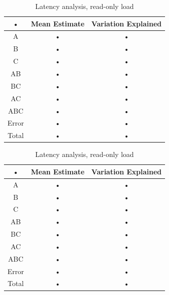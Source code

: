\documentclass[11pt,a4paper]{article}
\begin{document}
\begin{table}
\begin{minipage}{.5\textwidth}
\centering
	\begin{tabular}{|c|c|c|}
	\hline 
	• & {\small Mean Estimate} & {\small Variation Explained} \\ 
	\hline 
	A & • & • \\ 
	\hline 
	B & • & • \\ 
	\hline 
	C & • & • \\ 
	\hline 
	AB & • & • \\ 
	\hline 
	BC & • & • \\ 
	\hline 
	AC & • & • \\ 
	\hline 
	ABC & • & • \\ 
	\hline 
	Error & • & • \\ 
	\hline 
	Total & • & • \\ 
	\hline 
	\end{tabular} \caption{Throughput analysis, read-only load} \label{tab:2k-tpt-ro}
\end{minipage}%
\begin{minipage}{.5\textwidth}
\centering
	\begin{tabular}{|c|c|c|}
	\hline 
	• & {\small Mean Estimate} & {\small Variation Explained} \\ 
	\hline 
	A & • & • \\ 
	\hline 
	B & • & • \\ 
	\hline 
	C & • & • \\ 
	\hline 
	AB & • & • \\ 
	\hline 
	BC & • & • \\ 
	\hline 
	AC & • & • \\ 
	\hline 
	ABC & • & • \\ 
	\hline 
	Error & • & • \\ 
	\hline 
	Total & • & • \\ 
	\hline 
	\end{tabular} \caption{Latency analysis, read-only load} \label{tab:2k-lat-ro}
\end{minipage}
\end{table}\label{tab:2k-ro}
\end{document}
